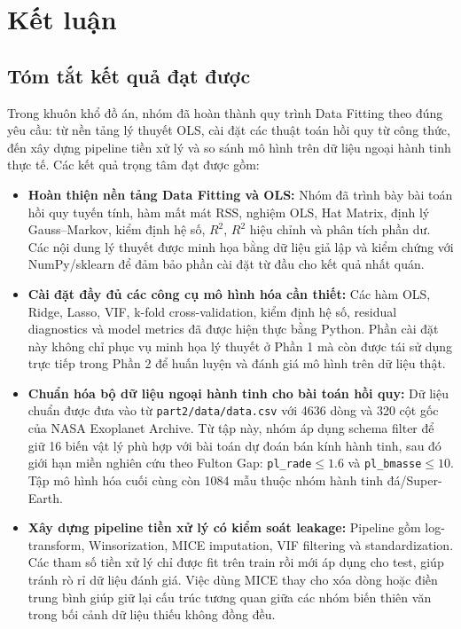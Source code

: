 \section{Kết luận}

\subsection{Tóm tắt kết quả đạt được}

Trong khuôn khổ đồ án, nhóm đã hoàn thành quy trình Data Fitting theo đúng yêu cầu:
từ nền tảng lý thuyết OLS, cài đặt các thuật toán hồi quy từ công thức, đến xây dựng
pipeline tiền xử lý và so sánh mô hình trên dữ liệu ngoại hành tinh thực tế. Các kết quả
trọng tâm đạt được gồm:

\begin{itemize}[itemsep=0.15cm, topsep=0.1cm]
    \item \textbf{Hoàn thiện nền tảng Data Fitting và OLS:} Nhóm đã trình bày bài toán hồi quy
          tuyến tính, hàm mất mát RSS, nghiệm OLS, Hat Matrix, định lý Gauss--Markov, kiểm định
          hệ số, $R^2$, $R^2$ hiệu chỉnh và phân tích phần dư. Các nội dung lý thuyết được minh
          họa bằng dữ liệu giả lập và kiểm chứng với NumPy/sklearn để đảm bảo phần cài đặt từ
          đầu cho kết quả nhất quán.

    \item \textbf{Cài đặt đầy đủ các công cụ mô hình hóa cần thiết:} Các hàm OLS, Ridge, Lasso,
          VIF, k-fold cross-validation, kiểm định hệ số, residual diagnostics và model metrics
          đã được hiện thực bằng Python. Phần cài đặt này không chỉ phục vụ minh họa lý thuyết
          ở Phần 1 mà còn được tái sử dụng trực tiếp trong Phần 2 để huấn luyện và đánh giá mô
          hình trên dữ liệu thật.

    \item \textbf{Chuẩn hóa bộ dữ liệu ngoại hành tinh cho bài toán hồi quy:} Dữ liệu chuẩn
          được đưa vào từ \texttt{part2/data/data.csv} với 4636 dòng và 320 cột gốc của NASA
          Exoplanet Archive. Từ tập này, nhóm áp dụng schema filter để giữ 16 biến vật lý phù
          hợp với bài toán dự đoán bán kính hành tinh, sau đó giới hạn miền nghiên cứu theo
          Fulton Gap: \texttt{pl\_rade}$\le1.6$ và \texttt{pl\_bmasse}$\le10$. Tập mô hình hóa
          cuối cùng còn 1084 mẫu thuộc nhóm hành tinh đá/Super-Earth.

    \item \textbf{Xây dựng pipeline tiền xử lý có kiểm soát leakage:} Pipeline gồm
          log-transform, Winsorization, MICE imputation, VIF filtering và standardization. Các
          tham số tiền xử lý chỉ được fit trên train rồi mới áp dụng cho test, giúp tránh rò rỉ
          dữ liệu đánh giá. Việc dùng MICE thay cho xóa dòng hoặc điền trung bình giúp giữ lại
          cấu trúc tương quan giữa các nhóm biến thiên văn trong bối cảnh dữ liệu thiếu không
          đồng đều.


\end{itemize}
